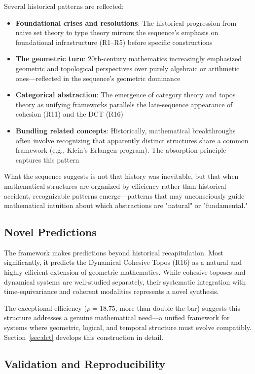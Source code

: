 \documentclass[11pt]{article}
\theoremstyle{definition}
\theoremstyle{plain}
\theoremstyle{remark}
\begin{document}
Several historical patterns are reflected:
\begin{itemize}
\item \textbf{Foundational crises and resolutions}: The historical progression from naive set theory to type theory mirrors the sequence's emphasis on foundational infrastructure (R1--R5) before specific constructions
\item \textbf{The geometric turn}: 20th-century mathematics increasingly emphasized geometric and topological perspectives over purely algebraic or arithmetic ones—reflected in the sequence's geometric dominance
\item \textbf{Categorical abstraction}: The emergence of category theory and topos theory as unifying frameworks parallels the late-sequence appearance of cohesion (R11) and the DCT (R16)
\item \textbf{Bundling related concepts}: Historically, mathematical breakthroughs often involve recognizing that apparently distinct structures share a common framework (e.g., Klein's Erlangen program). The absorption principle captures this pattern
\end{itemize}

What the sequence suggests is not that history was inevitable, but that when mathematical structures are organized by efficiency rather than historical accident, recognizable patterns emerge—patterns that may unconsciously guide mathematical intuition about which abstractions are "natural" or "fundamental."

\subsection{Novel Predictions}

The framework makes predictions beyond historical recapitulation. Most significantly, it predicts the Dynamical Cohesive Topos (R16) as a natural and highly efficient extension of geometric mathematics. While cohesive toposes and dynamical systems are well-studied separately, their systematic integration with time-equivariance and coherent modalities represents a novel synthesis.

The exceptional efficiency ($\rho = 18.75$, more than double the bar) suggests this structure addresses a genuine mathematical need—a unified framework for systems where geometric, logical, and temporal structure must evolve compatibly. Section~\ref{sec:dct} develops this construction in detail.

\subsection{Validation and Reproducibility}
\end{document}
